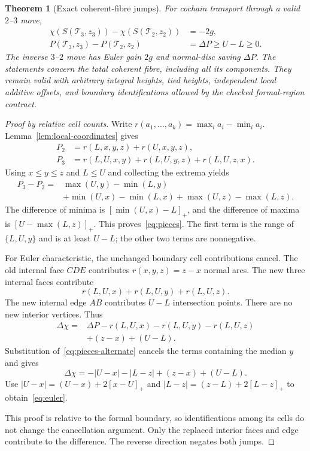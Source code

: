 \documentclass[11pt,letterpaper]{article}
\newtheorem{theorem}{Theorem}[section]
\theoremstyle{definition}
\theoremstyle{remark}
\begin{document}
\begin{theorem}[Exact coherent-fibre jumps]
\label{thm:jump}
For cochain transport through a valid $2$--$3$ move,
\begin{align}
 \chi(S(\mathcal T_3,z_3))-\chi(S(\mathcal T_2,z_2))&=-2g,\label{eq:euler}\\
 P(\mathcal T_3,z_3)-P(\mathcal T_2,z_2)&=\Delta P\ge U-L\ge0.
 \label{eq:discjump}
\end{align}
The inverse $3$--$2$ move has Euler gain $2g$ and normal-disc saving
$\Delta P$. The statements concern the total coherent fibre, including all
its components. They remain valid with arbitrary integral heights, tied
heights, independent local additive offsets, and boundary identifications
allowed by the checked formal-region contract.
\end{theorem}

\begin{proof}[Proof by relative cell counts]
Write $r(a_1,\ldots,a_k)=\max_i a_i-\min_i a_i$.
Lemma~\ref{lem:local-coordinates} gives
\begin{align*}
 P_2&=r(L,x,y,z)+r(U,x,y,z),\\
 P_3&=r(L,U,x,y)+r(L,U,y,z)+r(L,U,z,x).
\end{align*}
Using $x\le y\le z$ and $L\le U$ and collecting the extrema yields
\begin{align}
 P_3-P_2={}&\max(U,y)-\min(L,y)\nonumber\\
 &+\min(U,x)-\min(L,x)
  +\max(U,z)-\max(L,z).\label{eq:pieces-alternate}
\end{align}
The difference of minima is
$[\min(U,x)-L]_+$, and the difference of maxima is
$[U-\max(L,z)]_+$. This proves~\eqref{eq:pieces}.
The first term is the range of $\{L,U,y\}$ and is at least $U-L$;
the other two terms are nonnegative.

For Euler characteristic, the unchanged boundary cell contributions cancel.
The old internal face $CDE$ contributes $r(x,y,z)=z-x$ normal arcs.
The new three internal faces contribute
\[
 r(L,U,x)+r(L,U,y)+r(L,U,z).
\]
The new internal edge $AB$ contributes $U-L$ intersection points.
There are no new interior vertices. Thus
\begin{align*}
 \Delta\chi={}&\Delta P
  -r(L,U,x)-r(L,U,y)-r(L,U,z)\\
  &+(z-x)+(U-L).
\end{align*}
Substitution of~\eqref{eq:pieces-alternate} cancels the terms containing
the median $y$ and gives
\[
 \Delta\chi=-|U-x|-|L-z|+(z-x)+(U-L).
\]
Use $|U-x|=(U-x)+2[x-U]_+$ and
$|L-z|=(z-L)+2[L-z]_+$ to obtain~\eqref{eq:euler}.

This proof is relative to the formal boundary, so identifications among its
cells do not change the cancellation argument. Only the replaced interior
faces and edge contribute to the difference. The reverse direction
negates both jumps.
\end{proof}
\end{document}
